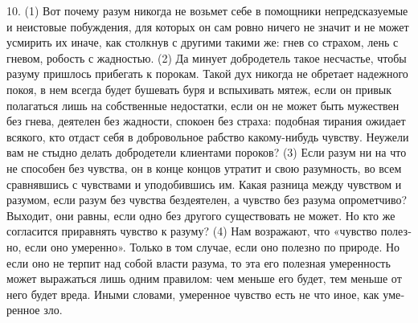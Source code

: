 10. (1) Вот поче­му разум нико­гда не возь­мет себе в помощ­ни­ки непред­ска­зу­е­мые и неисто­вые побуж­де­ния, для кото­рых он сам ров­но ниче­го не зна­чит и не может усми­рить их ина­че, как столк­нув с дру­ги­ми таки­ми же: гнев со стра­хом, лень с гне­вом, робость с жад­но­стью. (2) Да мину­ет доб­ро­де­тель такое несча­стье, чтобы разу­му при­шлось при­бе­гать к поро­кам. Такой дух нико­гда не обре­та­ет надеж­но­го покоя, в нем все­гда будет буше­вать буря и вспы­хи­вать мятеж, если он при­вык пола­гать­ся лишь на соб­ст­вен­ные недо­стат­ки, если он не может быть муже­ст­вен без гне­ва, дея­те­лен без жад­но­сти, спо­ко­ен без стра­ха: подоб­ная тира­ния ожи­да­ет вся­ко­го, кто отдаст себя в доб­ро­воль­ное раб­ство како­му-нибудь чув­ству. Неуже­ли вам не стыд­но делать доб­ро­де­те­ли кли­ен­та­ми поро­ков? (3) Если разум ни на что не спо­со­бен без чув­ства, он в кон­це кон­цов утра­тит и свою разум­ность, во всем срав­няв­шись с чув­ства­ми и упо­до­бив­шись им. Какая раз­ни­ца меж­ду чув­ст­вом и разу­мом, если разум без чув­ства без­де­я­те­лен, а чув­ство без разу­ма опро­мет­чи­во? Выхо­дит, они рав­ны, если одно без дру­го­го суще­ст­во­вать не может. Но кто же согла­сит­ся при­рав­нять чув­ство к разу­му? (4) Нам воз­ра­жа­ют, что «чув­ство полез­но, если оно уме­рен­но». Толь­ко в том слу­чае, если оно полез­но по при­ро­де. Но если оно не тер­пит над собой вла­сти разу­ма, то эта его полез­ная уме­рен­ность может выра­жать­ся лишь одним пра­ви­лом: чем мень­ше его будет, тем мень­ше от него будет вреда. Ины­ми сло­ва­ми, уме­рен­ное чув­ство есть не что иное, как уме­рен­ное зло.


